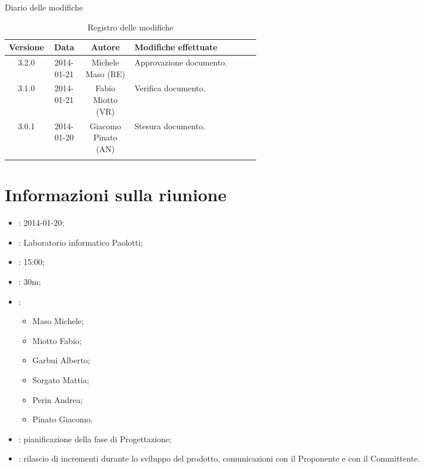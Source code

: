 
\newpage
Diario delle modifiche
\begin{center}
\begin{longtable}{|c|c|c|p{0.5\linewidth}|}
\toprule
\textbf{Versione} & \textbf{Data} & \textbf{Autore} & \textbf{Modifiche effettuate}\\

\midrule
3.2.0 & 2014-01-21 & Michele Maso (RE)  & Approvazione documento.\\
\midrule
3.1.0 & 2014-01-21 & Fabio Miotto (VR) & Verifica documento.\\
\midrule
3.0.1 & 2014-01-20 & Giacomo Pinato (AN) & Stesura documento.\\

\bottomrule
\caption{Registro delle modifiche}
\label{tab:changelog}
\end{longtable}
\end{center}

\newpage
\tableofcontents


\newpage
\section{Informazioni sulla riunione}%
\label{1.0}
\begin{itemize}
\item {}: 2014-01-20;
\item {}: Laboratorio informatico Paolotti;
\item {}: 15:00;
\item {}: 30m;
\item {}: \NomeGruppo{}
\begin{itemize}
\item Maso Michele;
\item Miotto Fabio;
\item Garbui Alberto;
\item Sorgato Mattia;
\item Perin Andrea;
\item Pinato Giacomo.
\end{itemize}
\item {}: pianificazione della fase di Progettazione;
\item {}: rilascio di incrementi durante lo sviluppo del prodotto, comunicazioni con il Proponente e con il Committente.
\end{itemize}

